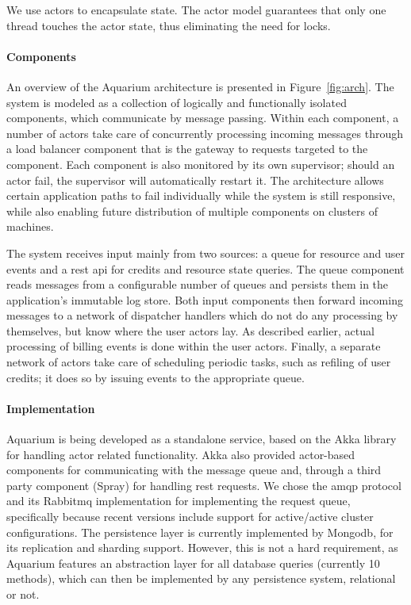 We use actors to encapsulate state. The actor model guarantees that only one thread touches the actor state, thus eliminating the need for locks. 

\paragraph{Components} An overview of the Aquarium architecture is
presented in Figure~\ref{fig:arch}. The system is modeled as a
collection of logically and functionally isolated components, which
communicate by message passing. Within each component, a number of
actors take care of concurrently processing incoming messages through
a load balancer component that is the gateway to requests targeted to
the component. Each component is also monitored by its own supervisor;
should an actor fail, the supervisor will automatically restart it.
The architecture allows certain application paths to fail individually
while the system is still responsive, while also enabling future
distribution of multiple components on clusters of machines.

The system receives input mainly from two sources: a queue for
resource and user events and a {\sc rest api} for credits and resource
state queries. The queue component reads messages from a configurable
number of queues and persists them in the application's immutable log
store. Both input components then forward incoming messages to a
network of dispatcher handlers which do not do any processing by
themselves, but know where the user actors lay. As described earlier,
actual processing of billing events is done within the user actors.
Finally, a separate network of actors take care of scheduling periodic
tasks, such as refiling of user credits; it does so by issuing events
to the appropriate queue.

\paragraph{Implementation}

Aquarium is being developed as a standalone service, based on the Akka library
for handling actor related functionality. Akka also provided actor-based
components for communicating with the message queue and, through a third party
component (Spray) for handling {\sc rest} requests. We chose the {\sc amqp}
protocol and its Rabbit{\sc mq} implementation for implementing the request
queue, specifically because recent versions include support for active/active
cluster configurations. The persistence layer is currently implemented by
Mongo{\sc db}, for its replication and sharding support. However, this is not a
hard requirement, as Aquarium features an abstraction layer for all database
queries (currently 10 methods), which can then be implemented by any
persistence system, relational or not.

